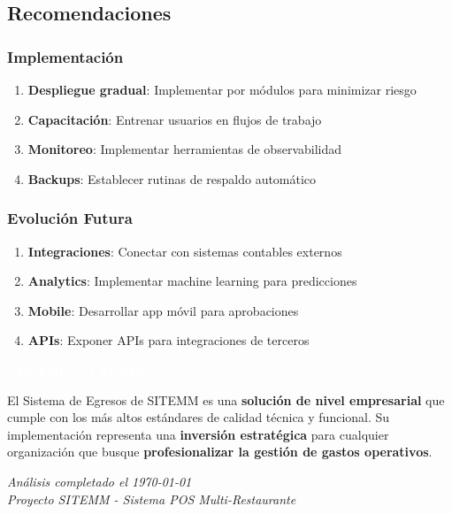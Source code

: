 \documentclass[12pt,a4paper]{article}
\begin{document}
\subsection{Recomendaciones}

\subsubsection{Implementación}
\begin{enumerate}[leftmargin=*]
    \item \textbf{Despliegue gradual}: Implementar por módulos para minimizar riesgo
    \item \textbf{Capacitación}: Entrenar usuarios en flujos de trabajo
    \item \textbf{Monitoreo}: Implementar herramientas de observabilidad
    \item \textbf{Backups}: Establecer rutinas de respaldo automático
\end{enumerate}

\subsubsection{Evolución Futura}
\begin{enumerate}[leftmargin=*]
    \item \textbf{Integraciones}: Conectar con sistemas contables externos
    \item \textbf{Analytics}: Implementar machine learning para predicciones
    \item \textbf{Mobile}: Desarrollar app móvil para aprobaciones
    \item \textbf{APIs}: Exponer APIs para integraciones de terceros
\end{enumerate}

\vspace{1cm}

\begin{center}
\colorbox{secondarygreen}{
\begin{minipage}{0.9\textwidth}
\centering
\textcolor{white}{\Large\textbf{VEREDICTO FINAL}}
\vspace{0.3cm}

El Sistema de Egresos de SITEMM es una \textbf{solución de nivel empresarial} que cumple con los más altos estándares de calidad técnica y funcional. Su implementación representa una \textbf{inversión estratégica} para cualquier organización que busque \textbf{profesionalizar la gestión de gastos operativos}.
\end{minipage}
}
\end{center}

\vspace{2cm}

\begin{flushright}
\textit{Análisis completado el \today}\\
\textit{Proyecto SITEMM - Sistema POS Multi-Restaurante}
\end{flushright}
\end{document}

